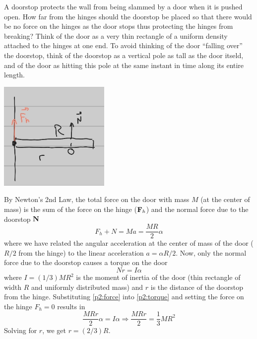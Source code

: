 \documentclass[12pt]{article}
\begin{document}
\begin{problem}{2}
A doorstop protects the wall from being slammed by a door when it is pushed
open. How far from the hinges should the doorstop be placed so that there would
be no force on the hinges as the door stops thus protecting the hinges from
breaking? Think of the door as a very thin rectangle of a uniform density
attached to the hinges at one end. To avoid thinking of the door ``falling
over'' the doorstop, think of the doorstop as a vertical pole as tall as the
door itseld, and of the door as hitting this pole at the same instant in time
along its entire length.
\begin{solution}
\begin{center}
    \includegraphics[width=0.4\textwidth]{hw5_p2.jpg} 
\end{center}
By Newton's 2nd Law, the total force on the door with mass $M$ (at the center 
of mass) is the sum of the force on the hinge ($\vb{F}_h$) and the normal force 
due to the doorstop $\vb{N}$
\begin{equation}\label{p2:force}
    F_h+N=Ma=\frac{MR}{2}\alpha 
\end{equation}
where we have related the angular acceleration at the center of mass of the door
($R /2$ from the hinge) to the linear acceleration $a=\alpha R /2$. Now, only
the normal force due to the doorstop causes a torque on the door
\begin{equation}\label{p2:torque}
        Nr=I\alpha 
\end{equation}
where $I=(1 /3)MR^2$ is the moment of inertia of the door (thin rectangle of
width $R$ and uniformly distributed mass) and $r$ is the
distance of the doorstop from the hinge. Substituting \eqref{p2:force} into
\eqref{p2:torque} and setting the force on the hinge $F_h=0$ results in
\begin{equation}
    \frac{MRr}{2}\alpha=I\alpha\Rightarrow\frac{MRr}{2}=\frac13MR^2
\end{equation}
Solving for $r$, we get $r=(2 /3)R$.
\end{solution}
\end{problem}
\end{document}
